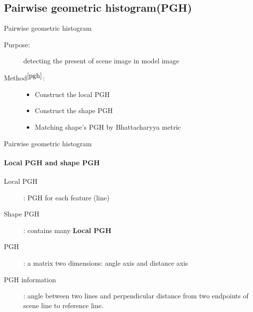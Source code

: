 \documentclass{beamer}
\begin{document}
\subsection{Pairwise geometric histogram(PGH)}
\begin{frame}{Pairwise geometric histogram}
	\begin{description}
		\item[Purpose:] detecting the present of scene image in model image
		\item[Method$^{\cite{pgh}}$:]
		\begin{itemize}
			\item Construct the local PGH
			\item Construct the shape PGH
			\item Matching shape's PGH by Bhattacharyya metric
		\end{itemize}
	\end{description}
\end{frame}
\begin{frame}{Pairwise geometric histogram}
	\framesubtitle{Local PGH and shape PGH}
	\begin{description}
		\item[Local PGH]: PGH for each feature (line)
		\item[Shape PGH]: contains many \textbf{Local PGH}
		\item[PGH]: a matrix two dimensions: angle axis and distance axis
		\item[PGH information]: angle between two lines and perpendicular distance from two endpoints of scene line to reference line.
	\end{description}
\end{frame}
\end{document}
